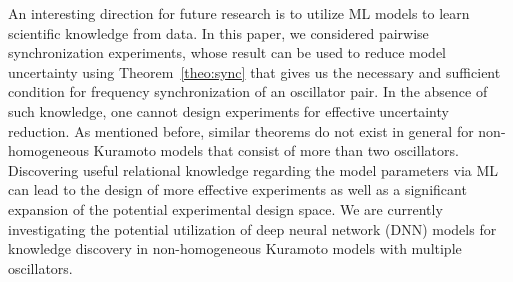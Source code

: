 \documentclass{article}
\begin{document}
An interesting direction for future research is to utilize ML models to learn scientific knowledge from data. In this paper, we considered pairwise synchronization experiments, whose result can be used to reduce model uncertainty using Theorem~\ref{theo:sync} that gives us the necessary and sufficient condition for frequency synchronization of an oscillator pair. In the absence of such knowledge, one cannot design experiments for effective uncertainty reduction. As mentioned before, similar theorems do not exist in general for non-homogeneous Kuramoto models that consist of more than two oscillators. Discovering useful relational knowledge regarding the model parameters via ML can lead to the design of more effective experiments as well as a significant expansion of the potential experimental design space. We are currently investigating the potential utilization of deep neural network (DNN) models for knowledge discovery in non-homogeneous Kuramoto models with multiple oscillators.

  
\end{document}
